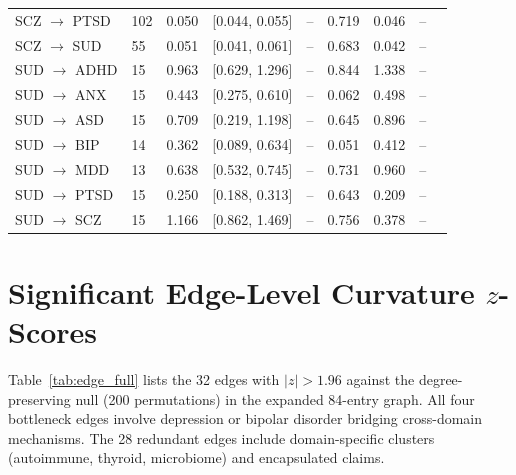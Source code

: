 \documentclass{article}
\begin{document}
\begin{table}[h]
\begin{tabular}{llccccccc}
SCZ $\to$ PTSD & 102 & 0.050 & [0.044, 0.055] & -- & 0.719 & 0.046 & -- \\
SCZ $\to$ SUD & 55 & 0.051 & [0.041, 0.061] & -- & 0.683 & 0.042 & -- \\
\midrule
SUD $\to$ ADHD & 15 & 0.963 & [0.629, 1.296] & -- & 0.844 & 1.338 & -- \\
SUD $\to$ ANX & 15 & 0.443 & [0.275, 0.610] & -- & 0.062 & 0.498 & -- \\
SUD $\to$ ASD & 15 & 0.709 & [0.219, 1.198] & -- & 0.645 & 0.896 & -- \\
SUD $\to$ BIP & 14 & 0.362 & [0.089, 0.634] & -- & 0.051 & 0.412 & -- \\
SUD $\to$ MDD & 13 & 0.638 & [0.532, 0.745] & -- & 0.731 & 0.960 & -- \\
SUD $\to$ PTSD & 15 & 0.250 & [0.188, 0.313] & -- & 0.643 & 0.209 & -- \\
SUD $\to$ SCZ & 15 & 1.166 & [0.862, 1.469] & -- & 0.756 & 0.378 & -- \\
\bottomrule
\end{tabular}
\end{table}

\section{Significant Edge-Level Curvature $z$-Scores}
\label{app:edges}

Table~\ref{tab:edge_full} lists the 32 edges with $|z| > 1.96$ against the degree-preserving null (200 permutations) in the expanded 84-entry graph. All four bottleneck edges involve depression or bipolar disorder bridging cross-domain mechanisms. The 28 redundant edges include domain-specific clusters (autoimmune, thyroid, microbiome) and encapsulated claims.
\end{document}
